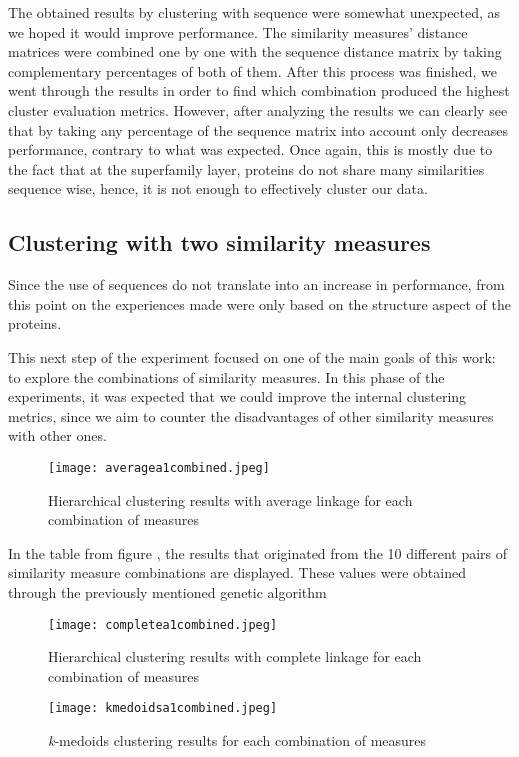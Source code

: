 The obtained results by clustering with sequence were somewhat unexpected, as we hoped it would improve performance. The similarity measures' distance matrices were combined one by one with the sequence distance matrix by taking complementary percentages of both of them. After this process was finished, we went through the results in order to find which combination produced the highest cluster evaluation metrics. However, after analyzing the results we can clearly see that by taking any percentage of the sequence matrix into account only decreases performance, contrary to what was expected. Once again, this is mostly due to the fact that at the superfamily layer, proteins do not share many similarities sequence wise, hence, it is not enough to effectively cluster our data.

\subsection{Clustering with two similarity measures}

Since the use of sequences do not translate into an increase in performance, from this point on the experiences made were only based on the structure aspect of the proteins.

This next step of the experiment focused on one of the main goals of this work: to explore the combinations of similarity measures. In this phase of the experiments, it was expected that we could improve the internal clustering metrics, since we aim to counter the disadvantages of other similarity measures with other ones. 

\begin{figure}[htbp]
	\centering
	\texttt{[image: averagea1combined.jpeg]}
	\caption{Hierarchical clustering results with average linkage for each combination of measures}
	\label{}
\end{figure}

In the table from figure , the results that originated from the 10 different pairs of similarity measure combinations are displayed. These values were obtained through the previously mentioned genetic algorithm

\begin{figure}[htbp]
	\centering
	\texttt{[image: completea1combined.jpeg]}
	\caption{Hierarchical clustering results with complete linkage for each combination of measures}
	\label{}
\end{figure}

\begin{figure}[htbp]
	\centering
	\texttt{[image: kmedoidsa1combined.jpeg]}
	\caption{\textit{k}-medoids clustering results for each combination of measures}
	\label{}
\end{figure}




